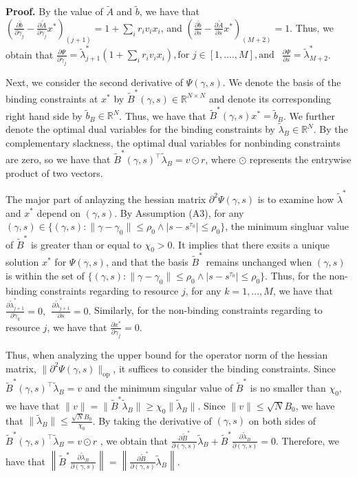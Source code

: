 \documentclass[10pt,a4paper]{amsart}
\renewenvironment{proof}[1]{\par\medskip\noindent\textbf{#1}\enspace\ignorespaces}{\par\medskip}
\newcommand{\R}{ \mathbb{R} }
\newcommand{\tB}{\tilde{B}}
\newcommand{\tilb}{\tilde{b}}
\newcommand{\tlam}{\tilde{\lambda}}
\renewcommand{\tilde}{\widetilde}
\begin{document}
\begin{proof}{Proof.}
	By the value of $\tilde{A}$ and $\tilde b$, we have that $  \left( \frac{\partial \tilde b}{\partial \gamma_j} - \frac{\partial \tilde{A} }{\partial \gamma_j} x^* \right)_{(j+1)} = 1 + \sum_{i} r_i v_i x_i$, and $ \left( \frac{\partial  \tilde b}{\partial s} - \frac{\partial \tilde{A}}{\partial s} x^* \right)_{(M+2)} = 1$. Thus, we obtain that $
		\frac{\partial \Psi}{\partial \gamma_j} =  \tlam_{j+1}^*(1 +\sum_{i} r_i v_i x_i), \text{for } j \in [1,....,M], \text{and } ~~\frac{\partial \Psi}{\partial s} = \tlam_{M+2}^* $. 
	
	
	
	
	
	
	Next, we consider the second derivative of $\Psi(\gamma, s)$. We denote the basis of the binding constraints at $x^*$ by $\tB^*(\gamma, s) \in \R^{N\times N}$ and denote its corresponding right hand side by $\tilb_B \in \R^{N}$. Thus, we have that $\tB^*(\gamma, s) x^* = \tilb_B$. We further denote the optimal dual variables for the binding constraints by $\tlam_B \in \R^N$. By the complementary slackness, the optimal dual variables for nonbinding constraints are zero, so we have that $\tB^*(\gamma, s)^\top \tlam_B = v \odot r$, where $\odot$ represents the entrywise product of two vectors.
	
	The major part of anlayzing the hessian matrix $\partial^2 \Psi(\gamma,s)$ is to examine how $\tlam^*$ and $x^*$ depend on $(\gamma, s)$. By Assumption (A3), for any $(\gamma,s) \in \{(\gamma,s): \|\gamma - \gamma_0\| \le \rho_0 \wedge |s-s^{\tau_0}|\leq\rho_0  \}$,  the minimum singluar value of $\tB^*$ is greater than or equal to $\chi_0>0$. It implies that there exsits a unique solution $x^*$ for $\Psi(\gamma, s)$, and that the basis $\tB^*$ remains unchanged when $(\gamma, s)$ is within the set of $\{(\gamma,s): \|\gamma - \gamma_0\| \le \rho_0 \wedge |s-s^{\tau_0}|\leq\rho_0  \}$. Thus, for the non-binding constraints regarding to resource $j$, for any $k = 1,...,M$, we have that $ \frac{\partial \tlam^*_{j+1}}{ \partial \gamma_k }  = 0, ~~ \frac{\partial \tlam^*_{j+1}}{ \partial s }  = 0.$
	Similarly, for the non-binding constraints regarding to resource $j$, we have that 
	$ \frac{\partial x^*}{ \partial \gamma_j }  = 0.$
	
	Thus, when analyzing the upper bound for the operator norm of the hessian matrix, $\|\partial^2 \Psi(\gamma,s)\|_{\mathrm{op}}$, it suffices to consider the binding constraints. Since $\tB^*(\gamma, s)^\top \tlam_B = v$ and the minimum singular value of $\tB^*$ is no smaller than $\chi_0$,  we have that $\|v\| = \| \tB^*\tlam_B \| \ge\chi_0  \|\tlam_B\|$. Since $\|v\| \le \sqrt{N}B_0$, we have that $\|\tlam_B\| \le \frac{ \sqrt{N}B_0}{\chi_0}$.
	By taking the derivative of $(\gamma, s)$ on both sides of $\tB^*(\gamma, s)^\top \tlam_B = v\odot r$ , we obtain that $\frac{\partial \tB^*}{ \partial (\gamma, s) } \tlam_B +  \tB^*  \frac{\partial \tlam_B}{ \partial (\gamma, s) } = 0.$ Therefore, we have that $
		\left\| \tB^*  \frac{\partial \tlam_B}{ \partial (\gamma, s) } \right\| = \left\| \frac{\partial \tB^*}{ \partial (\gamma, s) } \tlam_B \right\|.$ 
	

\end{proof}
\end{document}
